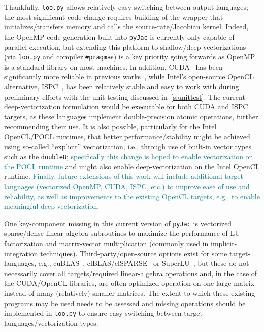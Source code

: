 \documentclass[12pt,number,sort&compress,preprint]{elsarticle}
\newcommand{\add}[1]{{\sloppy\textcolor{teal}{#1}}}  %
\begin{document}
Thankfully, \texttt{loo.py} allows relatively easy switching between output languages; the most significant code change requires building of the wrapper that initializes\slash transfers memory and calls the source-rate\slash Jacobian kernel.
Indeed, the OpenMP code-generation built into \texttt{pyJac} is currently only capable of parallel-execution, but extending this platform to shallow\slash deep-vectorizations (via \texttt{loo.py} and compiler \texttt{\#pragma}s) is a key priority going forwards as OpenMP is a standard library on most machines.
In addition, CUDA~\cite{NVIDIA:2018} has been significantly more reliable in previous works~\cite{Niemeyer:2016aa,CurtisGPU:2017}, while Intel's open-source OpenCL alternative, ISPC~\cite{pharr2012ispc}, has been relatively stable and easy to work with during preliminary efforts with the unit-testing discussed in~\cref{s:unittest}.
The current deep-vectorization formulation would be executable for both CUDA and ISPC targets, as these languages implement double-precision atomic operations, further recommending their use.
It is also possible, particularly for the Intel OpenCL\slash POCL runtimes, that better performance\slash stability might be achieved using so-called ``explicit'' vectorization, i.e., through use of built-in vector types such as the \texttt{double8}; \add{specifically this change is hoped to enable vectorization on the POCL runtime} and might also enable deep-vectorization on the Intel OpenCL runtime.
\add{Finally, future extensions of this work will include additional target-languages (vectorized OpenMP, CUDA, ISPC, etc.) to improve ease of use and reliability, as well as improvements to the existing OpenCL targets, e.g., to enable meaningful deep-vectorization.}

One key-component missing in this current version of \texttt{pyJac} is vectorized sparse\slash dense linear-algebra subroutines to maximize the performance of LU-factorization and matrix-vector multiplication (commonly used in implicit-integration techniques).
Third-party\slash open-source options exist for some target-languages, e.g., cuBLAS~\cite{cublas}, clBLAS\slash clSPARSE~\cite{clmath} or SuperLU~\cite{superlu99}, but these do not necessarily cover all targets\slash required linear-algebra operations and, in the case of the CUDA\slash OpenCL libraries, are often optimized operation on one large matrix instead of many (relatively) smaller matrices.
The extent to which these existing programs may be used needs to be assessed and missing operations should be implemented in \texttt{loo.py} to ensure easy switching between target-languages\slash vectorization types.
\end{document}
